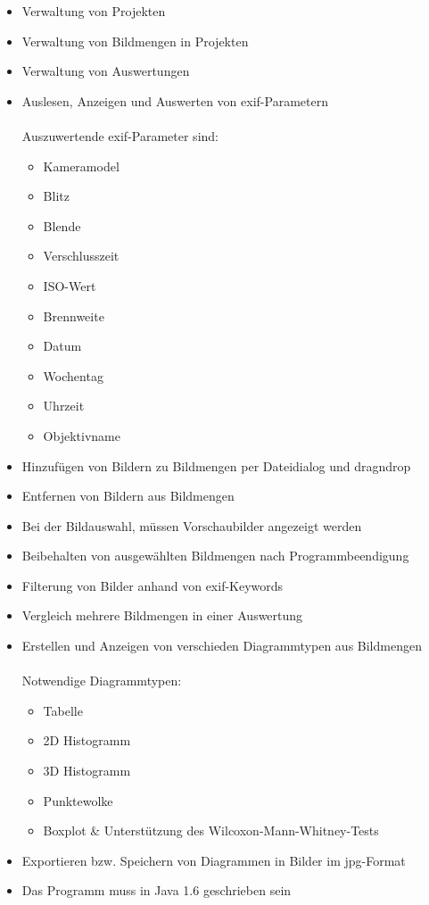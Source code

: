 \begin{itemize}
	\item Verwaltung von Projekten
	\item Verwaltung von Bildmengen in Projekten
	\item Verwaltung von Auswertungen
	\item Auslesen, Anzeigen und Auswerten von \gls{exif}-Parametern\\\\
				Auszuwertende \gls{exif}-Parameter sind:
				\label{subsec:auszuwertendedaten}
				\begin{itemize}
					\item Kameramodel
					\item Blitz
					\item Blende 
					\item Verschlusszeit
					\item ISO-Wert
					\item Brennweite
					\item Datum
					\item Wochentag
					\item Uhrzeit
					\item Objektivname
				\end{itemize}
	\item Hinzufügen von Bildern zu Bildmengen per Dateidialog und \gls{dragndrop}
	\item Entfernen von Bildern aus Bildmengen
	\item Bei der Bildauswahl, müssen Vorschaubilder angezeigt werden
	\item Beibehalten von ausgewählten Bildmengen nach Programmbeendigung
	\item Filterung von Bilder anhand von \gls{exif}-Keywords
	\item Vergleich mehrere Bildmengen in einer Auswertung
	\item Erstellen und Anzeigen von verschieden Diagrammtypen aus Bildmengen\\\\
				Notwendige Diagrammtypen:
				\begin{itemize}
					\item Tabelle
					\item 2D Histogramm
					\item 3D Histogramm
					\item Punktewolke
					\item Boxplot \& Unterstützung des Wilcoxon-Mann-Whitney-Tests
				\end{itemize}
	\item Exportieren bzw. Speichern von Diagrammen in Bilder im \gls{jpg}-Format
	\item Das Programm muss in Java 1.6 geschrieben sein
\end{itemize}

